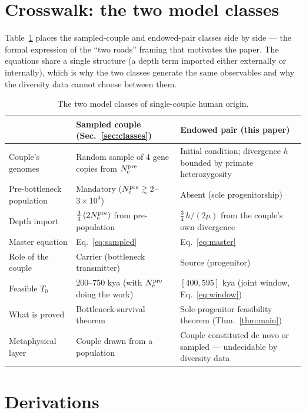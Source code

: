 \appendix

\section{Crosswalk: the two model classes}\label{app:crosswalk}
Table~\ref{tab:crosswalk} places the sampled-couple and endowed-pair
classes side by side --- the formal expression of the ``two roads''
framing that motivates the paper. The equations share a single structure
(a depth term imported either externally or internally), which is why the
two classes generate the same observables and why the diversity data
cannot choose between them.

\begin{table}[h]
\centering\small
\caption{The two model classes of single-couple human origin.}
\label{tab:crosswalk}
\begin{tabular}{p{3.4cm}p{5.4cm}p{5.4cm}}
\toprule
& Sampled couple (Sec.~\ref{sec:classes}) & Endowed pair (this paper) \\
\midrule
Couple's genomes &
Random sample of 4 gene copies from $N_{\mathrm{e}}^{\mathrm{pre}}$ &
Initial condition; divergence $h$ bounded by primate heterozygosity \\
Pre-bottleneck population &
Mandatory ($N_{\mathrm{e}}^{\mathrm{pre}} \gtrsim 2$--$3\times10^4$) &
Absent (sole progenitorship) \\
Depth import &
$\tfrac34\,(2N_{\mathrm{e}}^{\mathrm{pre}})$ from pre-population &
$\tfrac34\,h/(2\mu)$ from the couple's own divergence \\
Master equation &
Eq.~\eqref{eq:sampled} &
Eq.~\eqref{eq:master} \\
Role of the couple &
Carrier (bottleneck transmitter) &
Source (progenitor) \\
Feasible $T_0$ &
200--750 kya (with $N_{\mathrm{e}}^{\mathrm{pre}}$ doing the work) &
$[400, 595]$ kya (joint window, Eq.~\eqref{eq:window}) \\
What is proved &
Bottleneck-survival theorem &
Sole-progenitor feasibility theorem (Thm.~\ref{thm:main}) \\
Metaphysical layer &
Couple drawn from a population &
Couple constituted de novo or sampled --- undecidable by diversity data \\
\bottomrule
\end{tabular}
\end{table}

\section{Derivations}\label{app:derivations}

